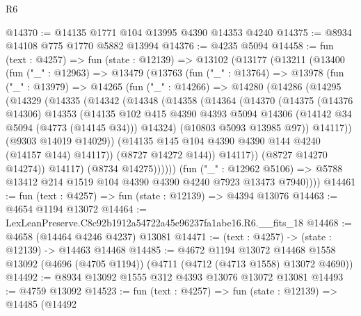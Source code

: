 \begin{lexlean}{R6}
\begin{coremodule}
@14370 := @14135 @1771 @104 @13995 @4390 @14353 @4240
@14375 := @8934 @14108 @775 @1770 @5882 @13994
@14376 := @4235 @5094
@14458 := fun (text : @4257) =>
  fun (state : @12139) =>
  @13102
    (@13177
      (@13211
        (@13400
          (fun ("_" : @12963) =>
          @13479
            (@13763
              (fun ("_" : @13764) =>
              @13978
                (fun ("_" : @13979) =>
                @14265
                  (fun ("_" : @14266) =>
                  @14280
                    (@14286
                      (@14295
                        (@14329
                          (@14335
                            (@14342
                              (@14348
                                (@14358
                                  (@14364
                                    (@14370
                                      (@14375
                                        (@14376 @14306)
                                        @14353
                                        (@14135
                                          @102
                                          @415
                                          @4390
                                          @4393
                                          @5094
                                          @14306
                                          (@14142 @34 @5094 (@4773 (@14145 @34)))
                                          @14324)
                                        (@10803 @5093 @13985 @97))
                                      @14117))
                                  (@9303 @14019 @14029))
                                (@14135 @145 @104 @4390 @4390 @144 @4240 (@14157 @144) @14117))
                              (@8727 @14272 @144))
                            @14117))
                        (@8727 @14270 @14274))
                      @14117)
                    (@8734 @14275))))))
          (fun ("_" : @12962 @5106) =>
          @5788 @13412 @214 @1519 @104 @4390 @4390 @4240 @7923 @13473 @7940))))
@14461 := fun (text : @4257) => fun (state : @12139) => @4394 @13076
@14463 := @4654 @1194 @13072
@14464 := LexLeanPreserve.C8c92b1912a54722a45e96237fa1abe16.R6.__fits_18
@14468 := @4658 (@14464 @4246 @4237) @13081
@14471 := (text : @4257) -> (state : @12139) -> @14463 @14468
@14485 := @4672
    @1194
    @13072
    @14468
    @1558
    @13092
    (@4696 (@4705 @1194))
    (@4711 (@4712 (@4713 @1558) @13072 @4690))
@14492 := @8934 @13092 @1555 @312 @4393 @13076 @13072 @13081
@14493 := @4759 @13092
@14523 := fun (text : @4257) =>
  fun (state : @12139) =>
  @14485
    (@14492

\end{coremodule}
\end{lexlean}
